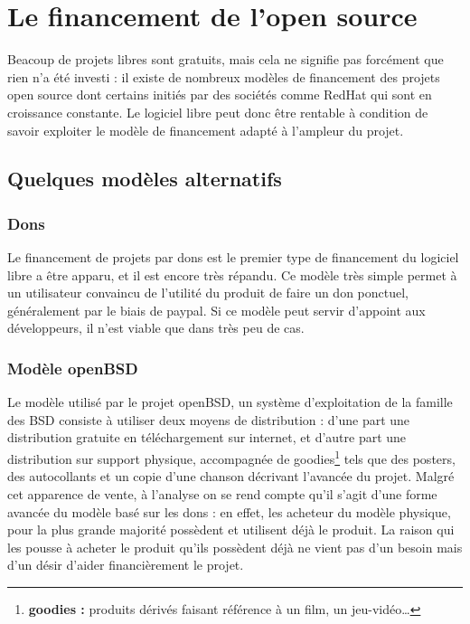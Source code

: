 \chapter{Le financement de l'open source}

Beacoup de projets libres sont gratuits, mais cela ne signifie pas forcément
que rien n'a été investi : il existe de nombreux modèles de financement des
projets open source dont certains initiés par des sociétés comme RedHat
qui sont en croissance constante. Le logiciel libre peut donc être rentable à
condition de savoir exploiter le modèle de financement adapté à l'ampleur du
projet.

\section{Quelques modèles alternatifs}

    \subsection{Dons}

Le financement de projets par dons est le premier type de financement du
logiciel libre a être apparu, et il est encore très répandu.
Ce modèle très simple permet à un utilisateur convaincu de l'utilité du
produit de faire un don ponctuel, généralement par le biais de paypal.
Si ce modèle peut servir d'appoint aux développeurs, il n'est viable que dans
très peu de cas.

    \subsection{Modèle openBSD}

Le modèle utilisé par le projet openBSD, un système d'exploitation de la
famille des BSD consiste à utiliser deux moyens de distribution : d'une part
une distribution gratuite en téléchargement sur internet, et d'autre part une
distribution sur support physique, accompagnée de
goodies\footnote{\textbf{goodies :} produits dérivés faisant référence à un
film, un jeu-vidéo\ldots} tels que des posters, des autocollants et
un copie d'une chanson décrivant l'avancée du projet.  Malgré cet apparence de
vente, à l'analyse on se rend compte qu'il s'agit d'une forme avancée du modèle
basé sur les dons : en effet, les acheteur du modèle physique, pour la plus
grande majorité possèdent et utilisent déjà le produit. La raison qui les
pousse à acheter le produit qu'ils possèdent déjà ne vient pas d'un besoin mais
d'un désir d'aider financièrement le projet.

